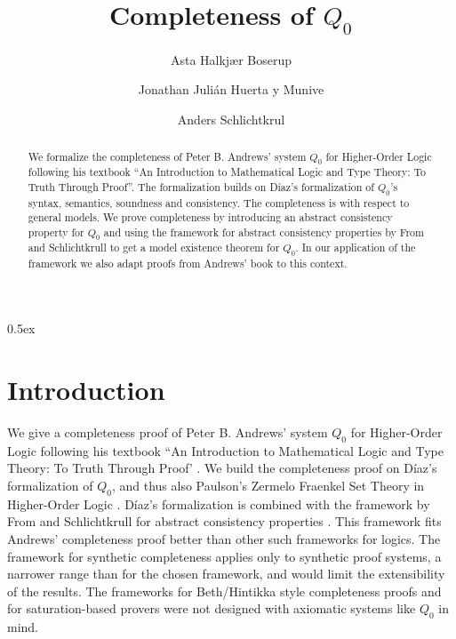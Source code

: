 \documentclass[10pt,a4paper]{article}
\begin{document}
\title{Completeness of $Q_0$}
\author{Asta Halkjær Boserup\and Jonathan Juli\'an Huerta y Munive\and Anders Schlichtkrul}
\maketitle

\begin{abstract}
  We formalize the completeness of Peter B. Andrews' system $Q_0$ for Higher-Order Logic 
  following his textbook ``An Introduction to Mathematical Logic and Type Theory: To Truth Through Proof''. 
  The formalization builds on D\'iaz's formalization of $Q_0$'s syntax, semantics, soundness and consistency. 
  The completeness is with respect to general models. We prove completeness by introducing an abstract 
  consistency property for $Q_0$ and using the framework for abstract consistency properties by From and 
  Schlichtkrull to get a model existence theorem for $Q_0$. In our application of the framework we also adapt
  proofs from Andrews' book to this context.
\end{abstract}

\tableofcontents

\parindent 0pt\parskip 0.5ex
\newpage
\section{Introduction}
We give a completeness proof of Peter B. Andrews' system $Q_0$ for Higher-Order Logic following 
his textbook ``An Introduction to Mathematical Logic and Type Theory: To Truth Through Proof' 
\cite{andrews2013introduction}. 
We build the completeness proof on D\'iaz's \cite{Q0_Metatheory-AFP} formalization of $Q_0$, and thus 
also Paulson's Zermelo Fraenkel Set Theory in Higher-Order Logic \cite{ZFC_in_HOL-AFP}. D\'iaz's formalization is
combined with the framework by From and Schlichtkrull for abstract consistency properties \cite{Abstract_Consistency_Property-AFP,DBLP:conf/itp/FromS25}.
This framework fits Andrews' completeness proof better than other such frameworks for logics.
The framework for synthetic completeness \cite{Synthetic_Completeness-AFP,DBLP:conf/cpp/From25} applies only to synthetic proof systems, a narrower range than for the chosen framework, and would limit the extensibility of the results. 
The frameworks for Beth/Hintikka style completeness proofs \cite{Abstract_Completeness-AFP,DBLP:conf/cade/Blanchette0T14,DBLP:journals/jar/BlanchettePT17}
and for saturation-based provers \cite{Splitting_Framework-AFP,DBLP:journals/jar/WaldmannTRB22,DBLP:conf/cade/EbnerBT21,DBLP:conf/cpp/TourretB21,Saturation_Framework_Extensions-AFP,DBLP:conf/cade/WaldmannTRB20} were not designed with axiomatic systems like $Q_0$ in mind.
\end{document}
